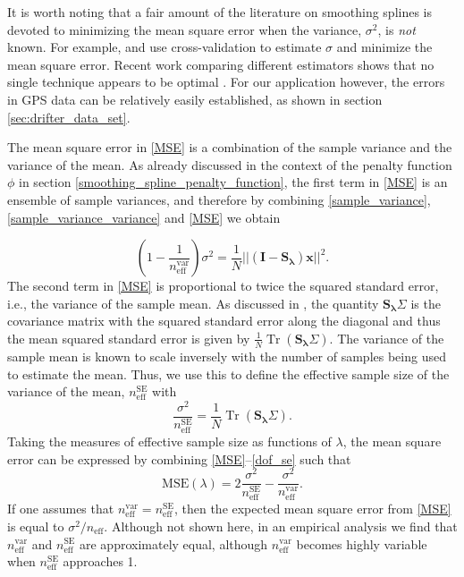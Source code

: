 \documentclass{ametsoc}
\DeclareMathOperator{\Tr}{Tr}
\begin{document}
It is worth noting that a fair amount of the literature on smoothing splines is devoted to minimizing the mean square error when the variance, $\sigma^2$, is \emph{not} known. For example, \citet{craven1979-nm} and \citet{wahba1978-jrss-b} use cross-validation to estimate $\sigma$ and minimize the mean square error. Recent work comparing different estimators shows that no single technique appears to be optimal \citep{lee2003-csda}. For our application however, the errors in GPS data can be relatively easily established, as shown in section \ref{sec:drifter_data_set}.

The mean square error in \eqref{MSE} is a combination of the sample variance and the variance of the mean. As already discussed in the context of the penalty function $\phi$ in section \ref{smoothing_spline_penalty_function}, the first term in \eqref{MSE} is an ensemble of sample variances, and therefore by combining \eqref{sample_variance},  \eqref{sample_variance_variance} and \eqref{MSE} we obtain

\begin{equation}
\label{dof_var}
    \left(1-\frac{1}{n_{\textrm{eff}}^{\textrm{var}}} \right)\sigma^2 = \frac{1}{N} || \left( \mathbf{I} - \mathbf{S_\lambda} \right) \mathbf{x} ||^2.
\end{equation}
The second term in \eqref{MSE} is proportional to twice the squared standard error, i.e., the variance of the sample mean. As discussed in \citet{teanby2007-mg}, the quantity $\mathbf{S_\lambda} \Sigma$ is the covariance matrix with the squared standard error along the diagonal and thus the mean squared standard error is given by $\frac{1}{N} \Tr \left( \mathbf{S_\lambda} \Sigma \right)$. The variance of the sample mean is known to scale inversely with the number of samples being used to estimate the mean. Thus, we use this to define the effective sample size of the variance of the mean, $n_{\textrm{eff}}^{\textrm{SE}}$ with
\begin{equation}
\label{dof_se}
    \frac{\sigma^2}{n_{\textrm{eff}}^{\textrm{SE}}} = \frac{1}{N} \Tr \left( \mathbf{S_\lambda} \Sigma \right).
\end{equation}
Taking the measures of effective sample size as functions of $\lambda$, the mean square error can be expressed by combining \eqref{MSE}--\eqref{dof_se} such that
\begin{equation}
    \textrm{MSE}(\lambda) = 2\frac{\sigma^2}{n_{\textrm{eff}}^{\textrm{SE}}} - \frac{\sigma^2}{n_{\textrm{eff}}^{\textrm{var}}}.
\end{equation}
If one assumes that $ n_{\textrm{eff}}^{\textrm{var}} = n_{\textrm{eff}}^{\textrm{SE}}$, then the expected mean square error from \eqref{MSE} is equal to $\sigma^2/n_{\textrm{eff}}$. Although not shown here, in an empirical analysis we find that $n_{\textrm{eff}}^{\textrm{var}}$ and $n_{\textrm{eff}}^{\textrm{SE}}$ are approximately equal, although $n_{\textrm{eff}}^{\textrm{var}}$ becomes highly variable when $n_{\textrm{eff}}^{\textrm{SE}}$ approaches 1. 
\end{document}
